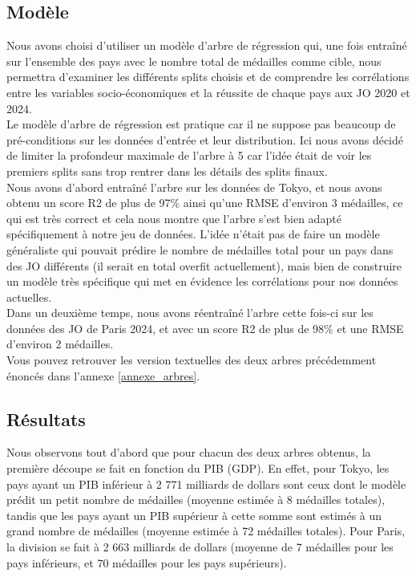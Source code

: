 \documentclass{article}
\begin{document}
\subsection{Modèle}

Nous avons choisi d'utiliser un modèle d'arbre de régression qui, une fois entraîné sur l'ensemble des pays avec le nombre total de médailles comme cible, nous permettra d'examiner les différents splits choisis et de comprendre les corrélations entre les variables socio-économiques et la réussite de chaque pays aux JO 2020 et 2024.
\\

Le modèle d'arbre de régression est pratique car il ne suppose pas beaucoup de pré-conditions sur les données d'entrée et leur distribution. Ici nous avons décidé de limiter la profondeur maximale de l'arbre à 5 car l'idée était de voir les premiers splits sans trop rentrer dans les détails des splits finaux.
\\

Nous avons d'abord entraîné l'arbre sur les données de Tokyo, et nous avons obtenu un score R2 de plus de 97\% ainsi qu'une RMSE d'environ 3 médailles, ce qui est très correct et cela nous montre que l'arbre s'est bien adapté spécifiquement à notre jeu de données. L'idée n'était pas de faire un modèle généraliste qui pouvait prédire le nombre de médailles total pour un pays dans des JO différents (il serait en total overfit actuellement), mais bien de construire un modèle très spécifique qui met en évidence les corrélations pour nos données actuelles.
\\

Dans un deuxième temps, nous avons réentraîné l'arbre cette fois-ci sur les données des JO de Paris 2024, et avec un score R2 de plus de 98\% et une RMSE d'environ 2 médailles.
\\

Vous pouvez retrouver les version textuelles des deux arbres précédemment énoncés dans l'annexe \ref{annexe_arbres}.

\subsection{Résultats}

Nous observons tout d'abord que pour chacun des deux arbres obtenus, la première découpe se fait en fonction du PIB (GDP). En effet, pour Tokyo, les pays ayant un PIB inférieur à  2 771 milliards de dollars sont ceux dont le modèle prédit un petit nombre de médailles (moyenne estimée à 8 médailles totales), tandis que les pays ayant un PIB supérieur à cette somme sont estimés à un grand nombre de médailles (moyenne estimée à 72 médailles totales). Pour Paris, la division se fait à 2 663 milliards de dollars (moyenne de 7 médailles pour les pays inférieurs, et 70 médailles pour les pays supérieurs).
\\
\end{document}

